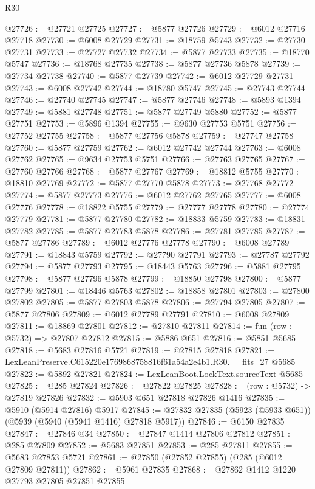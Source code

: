 \begin{lexlean}{R30}
\begin{coremodule}
@27726 := @27721 @27725
@27727 := @5877 @27726
@27729 := @6012 @27716 @27718
@27730 := @6008 @27729
@27731 := @18759 @5743
@27732 := @27730 @27731
@27733 := @27727 @27732
@27734 := @5877 @27733
@27735 := @18770 @5747
@27736 := @18768 @27735
@27738 := @5877 @27736 @5878
@27739 := @27734 @27738
@27740 := @5877 @27739
@27742 := @6012 @27729 @27731
@27743 := @6008 @27742
@27744 := @18780 @5747
@27745 := @27743 @27744
@27746 := @27740 @27745
@27747 := @5877 @27746
@27748 := @5893 @1394
@27749 := @5881 @27748
@27751 := @5877 @27749 @5880
@27752 := @5877 @27751
@27753 := @5896 @1394
@27755 := @9630 @27753 @5751
@27756 := @27752 @27755
@27758 := @5877 @27756 @5878
@27759 := @27747 @27758
@27760 := @5877 @27759
@27762 := @6012 @27742 @27744
@27763 := @6008 @27762
@27765 := @9634 @27753 @5751
@27766 := @27763 @27765
@27767 := @27760 @27766
@27768 := @5877 @27767
@27769 := @18812 @5755
@27770 := @18810 @27769
@27772 := @5877 @27770 @5878
@27773 := @27768 @27772
@27774 := @5877 @27773
@27776 := @6012 @27762 @27765
@27777 := @6008 @27776
@27778 := @18822 @5755
@27779 := @27777 @27778
@27780 := @27774 @27779
@27781 := @5877 @27780
@27782 := @18833 @5759
@27783 := @18831 @27782
@27785 := @5877 @27783 @5878
@27786 := @27781 @27785
@27787 := @5877 @27786
@27789 := @6012 @27776 @27778
@27790 := @6008 @27789
@27791 := @18843 @5759
@27792 := @27790 @27791
@27793 := @27787 @27792
@27794 := @5877 @27793
@27795 := @18443 @5763
@27796 := @5881 @27795
@27798 := @5877 @27796 @5878
@27799 := @18850 @27798
@27800 := @5877 @27799
@27801 := @18446 @5763
@27802 := @18858 @27801
@27803 := @27800 @27802
@27805 := @5877 @27803 @5878
@27806 := @27794 @27805
@27807 := @5877 @27806
@27809 := @6012 @27789 @27791
@27810 := @6008 @27809
@27811 := @18869 @27801
@27812 := @27810 @27811
@27814 := fun (row : @5732) => @27807 @27812
@27815 := @5886 @651
@27816 := @5851 @5685
@27818 := @5683 @27816 @5721
@27819 := @27815 @27818
@27821 := LexLeanPreserve.C615220e1769868758816f61a54a2e4b1.R30.__fits_27 @5685
@27822 := @5892 @27821
@27824 := LexLeanBoot.LockText.sourceText @5685
@27825 := @285 @27824
@27826 := @27822 @27825
@27828 := (row : @5732) -> @27819 @27826
@27832 := @5903 @651 @27818 @27826 @1416
@27835 := @5910 (@5914 @27816) @5917
@27845 := @27832 @27835 (@5923 (@5933 @651)) (@5939 (@5940 (@5941 @1416) @27818 @5917))
@27846 := @6150 @27835
@27847 := @27846 @34
@27850 := @27847 @1414 @27806 @27812
@27851 := @285 @27809
@27852 := @5683 @27851
@27853 := @285 @27811
@27855 := @5683 @27853 @5721
@27861 := @27850 (@27852 @27855) (@285 (@6012 @27809 @27811))
@27862 := @5961 @27835
@27868 := @27862 @1412 @1220 @27793 @27805 @27851 @27855

\end{coremodule}
\end{lexlean}
